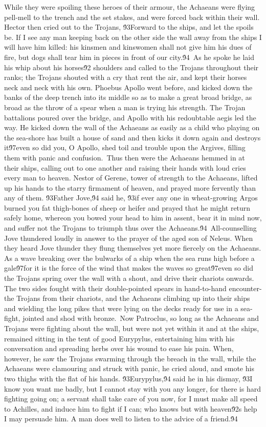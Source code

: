 {While they were spoiling these heroes of their armour, the Achaeans were flying pell-mell to the trench and the set stakes, and were forced back within their wall. Hector then cried out to the Trojans, \'93Forward to the ships, and let the spoils be. If I see any man keeping back on the other side the wall away from the ships I will have him killed: his kinsmen and kinswomen shall not give him his dues of fire, but dogs shall tear him in pieces in front of our city.\'94\
As he spoke he laid his whip about his horses\'92 shoulders and called to the Trojans throughout their ranks; the Trojans shouted with a cry that rent the air, and kept their horses neck and neck with his own. Phoebus Apollo went before, and kicked down the banks of the deep trench into its middle so as to make a great broad bridge, as broad as the throw of a spear when a man is trying his strength. The Trojan battalions poured over the bridge, and Apollo with his redoubtable aegis led the way. He kicked down the wall of the Achaeans as easily as a child who playing on the sea-shore has built a house of sand and then kicks it down again and destroys it\'97even so did you, O Apollo, shed toil and trouble upon the Argives, filling them with panic and confusion.\
Thus then were the Achaeans hemmed in at their ships, calling out to one another and raising their hands with loud cries every man to heaven. Nestor of Gerene, tower of strength to the Achaeans, lifted up his hands to the starry firmament of heaven, and prayed more fervently than any of them. \'93Father Jove,\'94 said he, \'93if ever any one in wheat-growing Argos burned you fat thigh-bones of sheep or heifer and prayed that he might return safely home, whereon you bowed your head to him in assent, bear it in mind now, and suffer not the Trojans to triumph thus over the Achaeans.\'94\
All-counselling Jove thundered loudly in answer to the prayer of the aged son of Neleus. When they heard Jove thunder they flung themselves yet more fiercely on the Achaeans. As a wave breaking over the bulwarks of a ship when the sea runs high before a gale\'97for it is the force of the wind that makes the waves so great\'97even so did the Trojans spring over the wall with a shout, and drive their chariots onwards. The two sides fought with their double-pointed spears in hand-to-hand encounter-the Trojans from their chariots, and the Achaeans climbing up into their ships and wielding the long pikes that were lying on the decks ready for use in a sea-fight, jointed and shod with bronze.\
Now Patroclus, so long as the Achaeans and Trojans were fighting about the wall, but were not yet within it and at the ships, remained sitting in the tent of good Eurypylus, entertaining him with his conversation and spreading herbs over his wound to ease his pain. When, however, he saw the Trojans swarming through the breach in the wall, while the Achaeans were clamouring and struck with panic, he cried aloud, and smote his two thighs with the flat of his hands. \'93Eurypylus,\'94 said he in his dismay, \'93I know you want me badly, but I cannot stay with you any longer, for there is hard fighting going on; a servant shall take care of you now, for I must make all speed to Achilles, and induce him to fight if I can; who knows but with heaven\'92s help I may persuade him. A man does well to listen to the advice of a friend.\'94\
}

